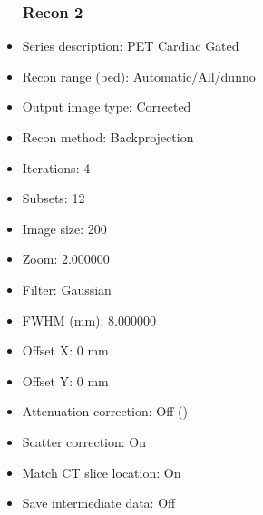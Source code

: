 \documentclass[12pt]{article}
\begin{document}
\begin{itemize}
\subsubsection{Recon 2}
\item Series description: PET Cardiac Gated
\item Recon range (bed): Automatic/All/dunno
\item Output image type: Corrected
\item Recon method: Backprojection
\item Iterations: 4
\item Subsets: 12
\item Image size: 200
\item Zoom: 2.000000
\item Filter: Gaussian
\item FWHM (mm): 8.000000
\item Offset X: 0 mm
\item Offset Y: 0 mm
\item Attenuation correction: Off ()
\item Scatter correction: On
\item Match CT slice location: On
\item Save intermediate data: Off
\end{itemize}
\end{document}
